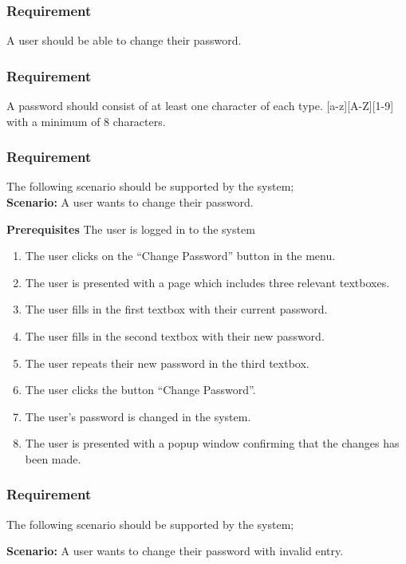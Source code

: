 \documentclass{article}
\begin{document}
\subsubsection{Requirement}
A user should be able to change their password.
\subsubsection{Requirement}
A password should consist of at least one character of each type. [a-z][A-Z][1-9] with a minimum of 8 characters.

\subsubsection{Requirement}
The following scenario should be supported by the system;\\

\textbf{Scenario:} A user wants to change their password.

\textbf{Prerequisites} The user is logged in to the system

\begin{enumerate}
    \item The user clicks on the “Change Password” button in the menu.
    \item The user is presented with a page which includes three relevant textboxes.
    \item The user fills in the first textbox with their current password.
    \item The user fills in the second textbox with their new password.
    \item The user repeats their new password in the third textbox.
    \item The user clicks the button “Change Password”.
    \item The user's password is changed in the system.
    \item The user is presented with a popup window confirming that the changes has been made.
\end{enumerate}



\subsubsection{Requirement}
The following scenario should be supported by the system;

\textbf{Scenario:} A user wants to change their password with invalid entry.
\end{document}
